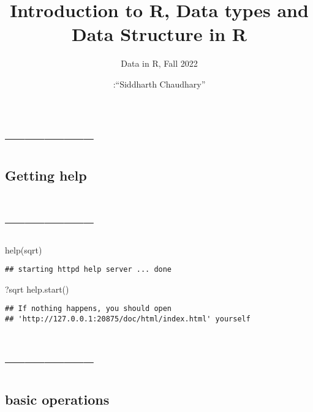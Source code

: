 \documentclass[
]{article}
\title{Introduction to R, Data types and Data Structure in R}
\subtitle{Data in R, Fall 2022}
\author{:``Siddharth Chaudhary''}
\date{}
\newenvironment{Shaded}{\begin{snugshade}}{\end{snugshade}}
\newcommand{\FunctionTok}[1]{\textcolor[rgb]{0.00,0.00,0.00}{#1}}
\newcommand{\NormalTok}[1]{#1}
\begin{document}
\maketitle

\hypertarget{section}{%
\section{--------------}\label{section}}

\hypertarget{getting-help}{%
\subsection{Getting help}\label{getting-help}}

\hypertarget{section-1}{%
\section{--------------}\label{section-1}}

\begin{Shaded}
\begin{Highlighting}[]
\FunctionTok{help}\NormalTok{(sqrt)}
\end{Highlighting}
\end{Shaded}

\begin{verbatim}
## starting httpd help server ... done
\end{verbatim}

\begin{Shaded}
\begin{Highlighting}[]
\NormalTok{?sqrt}
\FunctionTok{help.start}\NormalTok{()}
\end{Highlighting}
\end{Shaded}

\begin{verbatim}
## If nothing happens, you should open
## 'http://127.0.0.1:20875/doc/html/index.html' yourself
\end{verbatim}

\hypertarget{section-2}{%
\section{--------------}\label{section-2}}

\hypertarget{basic-operations}{%
\subsection{basic operations}\label{basic-operations}}
\end{document}
